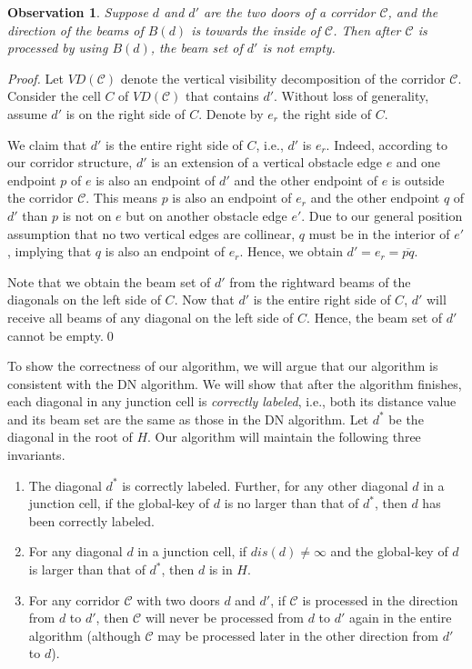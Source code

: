 \documentclass[english,runningheads,11pt]{llncs-revised}
\def\calC{\mathcal{C}}
\newcommand{\vtd}{\mbox{$V\!D$}}
\newtheorem{observation}{Observation}
\begin{document}
\begin{observation}\label{obser:20}
Suppose $d$ and $d'$ are the two doors of a corridor $\calC$, and the
direction of the beams of $B(d)$ is towards the inside of $\calC$. Then after $\calC$ is
processed by using $B(d)$, the beam set of $d'$ is not empty.
\end{observation}
\begin{proof}
Let $\vtd(\calC)$ denote the vertical visibility decomposition of the
corridor $\calC$.
Consider the cell $C$ of $\vtd(\calC)$ that contains $d'$.
Without loss of generality, assume $d'$ is on the right side of
$C$. Denote by $e_r$ the right side of $C$.

We claim that $d'$ is the entire right side of $C$, i.e., $d'$ is $e_r$.
Indeed, according to our corridor structure, $d'$ is an extension of a
vertical obstacle edge $e$ and one endpoint $p$ of $e$ is also an endpoint of
$d'$ and the other endpoint of $e$ is outside the corridor $\calC$. This
means $p$ is also an endpoint of $e_r$ and
the other endpoint $q$ of $d'$ than $p$ is not on $e$ but on
another obstacle edge $e'$. Due to our general position assumption
that no two vertical edges are collinear, $q$ must be in the interior of
$e'$, implying that $q$ is also an endpoint of $e_r$. Hence, we obtain $d'=e_r=\overline{pq}$.


Note that we obtain the beam set of $d'$ from the rightward beams of
the diagonals on the left side of $C$. Now that $d'$ is
the entire right side of $C$, $d'$ will receive all beams of any
diagonal on the left side of $C$. Hence, the beam set of $d'$ cannot be empty.\qed
\end{proof}

To show the correctness of our algorithm, we will argue that
our algorithm is consistent with the DN algorithm.
We will show that after the algorithm finishes, each diagonal
in any junction cell is {\em correctly labeled}, i.e.,
both its distance value and its beam set are the same as those in the
DN algorithm.  Let $d^*$ be the diagonal in the root of $H$.
Our algorithm will maintain the following three invariants.

\begin{enumerate}
\item
The diagonal $d^*$ is correctly labeled. Further,
for any other diagonal $d$ in a junction cell, if the global-key of $d$ is no larger than that of $d^*$, then $d$ has been  correctly labeled.




\item
For any diagonal $d$ in a junction cell, if $dis(d)\neq \infty$ and
the global-key of $d$ is larger than that of $d^*$, then $d$ is in $H$.

\item
For any corridor $\calC$ with two doors $d$ and $d'$, if $\calC$ is
processed in the direction from $d$ to $d'$,
then $\calC$ will never be processed from $d$ to $d'$ again in the entire
algorithm (although $\calC$ may be processed later in the other direction from $d'$ to $d$).
\end{enumerate}
\end{document}
